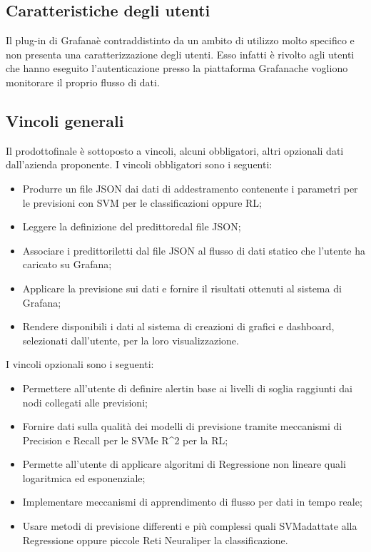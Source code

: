 	\subsection{Caratteristiche degli utenti}
	Il plug-in di Grafana\glosp è contraddistinto da un ambito di utilizzo molto specifico e non presenta una caratterizzazione degli utenti. Esso infatti è rivolto agli utenti che hanno eseguito l'autenticazione presso la piattaforma Grafana\glosp che vogliono monitorare il proprio flusso di dati.
	\subsection{Vincoli generali}
	Il prodotto\glosp finale è sottoposto a vincoli, alcuni obbligatori, altri opzionali dati dall'azienda proponente.
	I vincoli obbligatori sono i seguenti:
	\begin{itemize}
		\item Produrre un file JSON dai dati di addestramento contenente i parametri per le previsioni con SVM per le classificazioni oppure RL;
		\item Leggere la definizione del predittore\glosp dal file JSON;
		\item Associare i predittori\glosp letti dal file JSON al flusso di dati statico che l'utente ha caricato su Grafana\glo;
		\item Applicare la previsione sui dati e fornire il risultati ottenuti al sistema di Grafana\glo;
		\item Rendere disponibili i dati al sistema di creazioni di grafici e dashboard\glo, selezionati dall'utente, per la loro visualizzazione.
	\end{itemize}
	I vincoli opzionali sono i seguenti:
	\begin{itemize}
		\item Permettere all'utente di definire alert\glosp in base ai livelli di soglia raggiunti dai nodi collegati alle previsioni;
		\item Fornire dati sulla qualità dei modelli di previsione tramite meccanismi di Precision e Recall per le SVM\glosp e R\^{}2 per la RL\glo;
		\item Permette all'utente di applicare algoritmi di Regressione non lineare quali logaritmica ed esponenziale;
		\item Implementare meccanismi di apprendimento di flusso per dati in tempo reale;
		\item Usare metodi di previsione differenti e più complessi quali SVM\glosp adattate alla Regressione oppure piccole Reti Neurali\glosp per la classificazione.
	\end{itemize}
